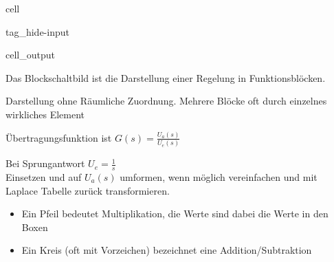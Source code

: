 \documentclass[letterpaper,10pt,english]{jupyterBook}
\begin{document}
\begin{sphinxuseclass}{cell}
\begin{sphinxuseclass}{tag_hide-input}\begin{sphinxVerbatimOutput}

\begin{sphinxuseclass}{cell_output}
\noindent{}

\end{sphinxuseclass}\end{sphinxVerbatimOutput}

\end{sphinxuseclass}
\end{sphinxuseclass}
\begin{DUlineblock}{0em}
\item[] 
\end{DUlineblock}

\sphinxAtStartPar
Das Blockschaltbild ist die Darstellung einer Regelung in Funktionsblöcken.

\sphinxAtStartPar
Darstellung ohne Räumliche Zuordnung.
Mehrere Blöcke oft durch einzelnes wirkliches Element

\begin{DUlineblock}{0em}
\item[] 
\end{DUlineblock}

\sphinxAtStartPar
Übertragungsfunktion ist \(G(s) = \frac{U_a(s)}{U_e(s)}\)

\sphinxAtStartPar
Bei Sprungantwort \(U_e = \frac{1}{s}\)\\
Einsetzen und auf \(U_a(s)\) umformen,
wenn möglich vereinfachen
und mit Laplace Tabelle zurück transformieren.

\begin{DUlineblock}{0em}
\item[] 
\end{DUlineblock}
\begin{itemize}
\item {} 
\sphinxAtStartPar
Ein Pfeil bedeutet Multiplikation, die Werte sind dabei die Werte in den Boxen

\item {} 
\sphinxAtStartPar
Ein Kreis (oft mit Vorzeichen) bezeichnet eine Addition/Subtraktion

\end{itemize}
\end{document}
